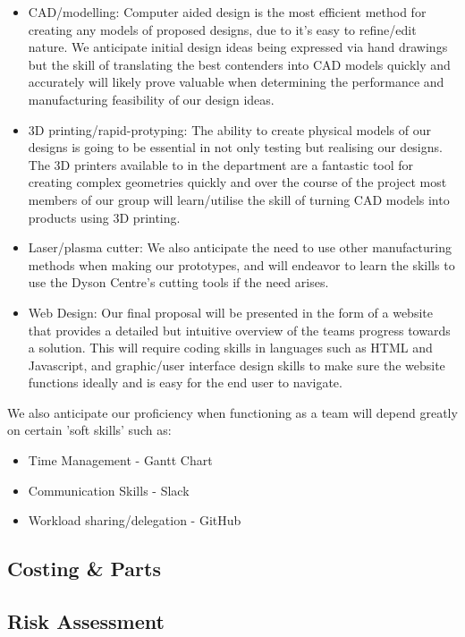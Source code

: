 \documentclass[12pt]{article}
\def\n{\noindent}
\begin{document}
\begin{itemize}
\item CAD/modelling: Computer aided design is the most efficient method for creating any models of proposed designs, due to it's easy to refine/edit nature. We anticipate initial design ideas being expressed via hand drawings but the skill of translating the best contenders into CAD models quickly and accurately will likely prove valuable when determining the performance and manufacturing feasibility of our design ideas. 
\item 3D printing/rapid-protyping: The ability to create physical models of our designs is going to be essential in not only testing but realising our designs. The 3D printers available to in the department are a fantastic tool for creating complex geometries quickly and over the course of the project most members of our group will learn/utilise the skill of turning CAD models into products using 3D printing. 
\item Laser/plasma cutter: We also anticipate the need to use other manufacturing methods when making our prototypes, and will endeavor to learn the skills to use the Dyson Centre's cutting tools if the need arises. 
\item Web Design: Our final proposal will be presented in the form of a website that provides a detailed but intuitive overview of the teams progress towards a solution. This will require coding skills in languages such as HTML and Javascript, and graphic/user interface design skills to make sure the website functions ideally and is easy for the end user to navigate.  
\end{itemize}
 
\n We also anticipate our proficiency when functioning as a team will depend greatly on certain 'soft skills' such as: 

\begin{itemize}
\item Time Management - Gantt Chart 
\item Communication Skills - Slack 
\item Workload sharing/delegation - GitHub 
\end{itemize}

\subsection{Costing \& Parts}

\subsection{Risk Assessment}
\end{document}
